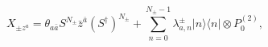 \begin{equation}\label{eq:ax}
 X_{\pm z^a}=\theta_{a\bar{a}}S^{N_\pm}\bar{z}^{\bar{a}}
 (S^\dagger)^{N_\pm}+
 \sum_{n=0}^{N_\pm-1}\lambda_{a,n}^{\pm}|n\rangle\langle n|\otimes 
 P_0^{(2)},
\end{equation}


